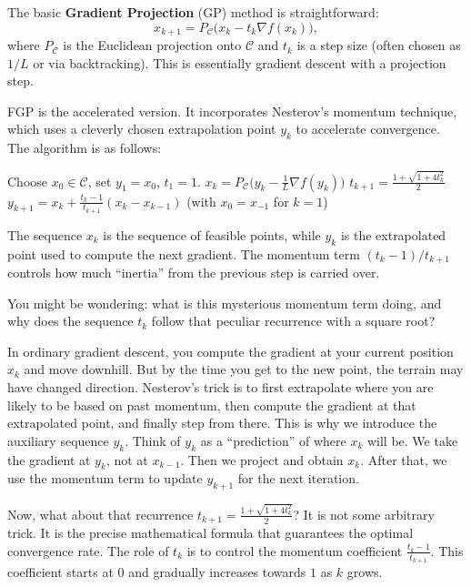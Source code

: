\documentclass[lang=en,color=blue,mode=fancy,titlestyle=hang]{elegantbook}
\begin{document}
The basic \textbf{Gradient Projection} (GP) method is straightforward:
\[
x_{k+1} = P_{\mathcal{C}}\bigl( x_k - t_k \nabla f(x_k) \bigr),
\]
where $P_{\mathcal{C}}$ is the Euclidean projection onto $\mathcal{C}$ and $t_k$ is a step size
(often chosen as $1/L$ or via backtracking). This is essentially gradient descent with a projection
step.

FGP is the accelerated version. It incorporates Nesterov's momentum technique, which uses a cleverly
chosen extrapolation point $y_k$ to accelerate convergence. The algorithm is as follows:

\begin{algorithm}[H]
\caption{Fast Gradient Projection Method}
\begin{algorithmic}
\State Choose $x_0 \in \mathcal{C}$, set $y_1 = x_0$, $t_1 = 1$.
  \State $x_k = P_{\mathcal{C}}\bigl( y_k - \frac{1}{L} \nabla f(y_k) \bigr)$
  \State $t_{k+1} = \frac{1 + \sqrt{1 + 4t_k^2}}{2}$
  \State $y_{k+1} = x_k + \frac{t_k - 1}{t_{k+1}} (x_k - x_{k-1})$ \quad (with $x_0 = x_{-1}$ for $k=1$)
\EndFor
\end{algorithmic}
\end{algorithm}

The sequence $x_k$ is the sequence of feasible points, while $y_k$ is the extrapolated point used
to compute the next gradient. The momentum term $(t_k-1)/t_{k+1}$ controls how much ``inertia''
from the previous step is carried over.

You might be wondering: what is this mysterious momentum term doing, and why does the sequence $t_k$
follow that peculiar recurrence with a square root?

In ordinary gradient descent, you compute the gradient at your current position $x_k$ and move
downhill. But by the time you get to the new point, the terrain may have changed direction.
Nesterov's trick is to first extrapolate where you are likely to be based on past momentum, then
compute the gradient at that extrapolated point, and finally step from there. This is why we
introduce the auxiliary sequence $y_k$. Think of $y_k$ as a ``prediction'' of where $x_k$ will be.
We take the gradient at $y_k$, not at $x_{k-1}$. Then we project and obtain $x_k$. After that,
we use the momentum term to update $y_{k+1}$ for the next iteration.

Now, what about that recurrence $t_{k+1} = \frac{1 + \sqrt{1 + 4t_k^2}}{2}$? It is not some arbitrary
trick. It is the precise mathematical formula that guarantees the optimal convergence rate. The role
of $t_k$ is to control the momentum coefficient $\frac{t_k - 1}{t_{k+1}}$. This coefficient starts
at $0$ and gradually increases towards $1$ as $k$ grows.
\end{document}
